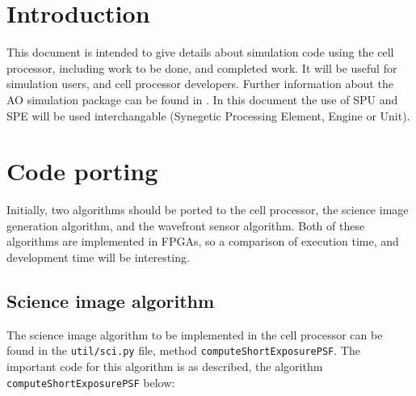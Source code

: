 \documentclass{article}
\begin{document}

\renewcommand{\dasptitle}{The cell processor for AO simulation}
\renewcommand{\daspdocno}{AOSIM-CEL-UoD-001}

\section{Introduction}
This document is intended to give details about simulation code using
the cell processor, including work to be done, and completed work.  It
will be useful for simulation users, and cell processor developers.
Further information about the AO simulation package can be found in
\citet{overview}.  In this document the use of SPU and SPE will be
used interchangable (Synegetic Processing Element, Engine or Unit).

\section{Code porting}
Initially, two algorithms should be ported to the cell processor, the
science image generation algorithm, and the wavefront sensor
algorithm.  Both of these algorithms are implemented in FPGAs, so a
comparison of execution time, and development time will be
interesting.

\subsection{Science image algorithm}
The science image algorithm to be implemented in the cell processor
can be found in the \texttt{util/sci.py} file, method
\texttt{computeShortExposurePSF}.  The important code for this
algorithm is as described, the algorithm
\texttt{computeShortExposurePSF} below:
\end{document}
